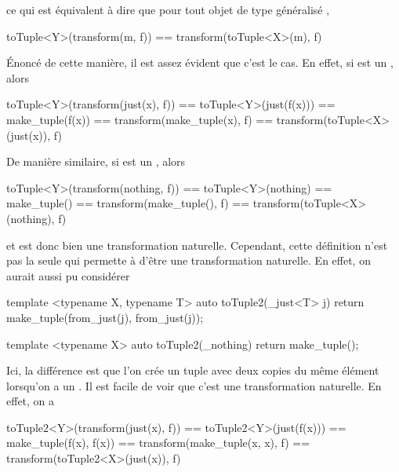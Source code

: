 ce qui est équivalent à dire que pour tout objet  de type généralisé
,
\begin{cpp}
    toTuple<Y>(transform(m, f)) == transform(toTuple<X>(m), f)
\end{cpp}

Énoncé de cette manière, il est assez évident que c'est le cas. En effet, si
 est un , alors
\begin{cpp}
    toTuple<Y>(transform(just(x), f)) == toTuple<Y>(just(f(x)))
                                      == make_tuple(f(x))
                                      == transform(make_tuple(x), f)
                                      == transform(toTuple<X>(just(x)), f)
\end{cpp}

De manière similaire, si  est un , alors
\begin{cpp}
    toTuple<Y>(transform(nothing, f)) == toTuple<Y>(nothing)
                                      == make_tuple()
                                      == transform(make_tuple(), f)
                                      == transform(toTuple<X>(nothing), f)
\end{cpp}

et  est donc bien une transformation naturelle. Cependant, cette
définition n'est pas la seule qui permette à  d'être une
transformation naturelle. En effet, on aurait aussi pu considérer
\begin{cpp}
    template <typename X, typename T>
    auto toTuple2(_just<T> j) {
        return make_tuple(from_just(j), from_just(j));
    }

    template <typename X>
    auto toTuple2(_nothing) {
        return make_tuple();
    }
\end{cpp}

Ici, la différence est que l'on crée un tuple avec deux copies du même élément
lorsqu'on a un . Il est facile de voir que c'est une
transformation naturelle. En effet, on a
\begin{cpp}
    toTuple2<Y>(transform(just(x), f)) == toTuple2<Y>(just(f(x)))
                                       == make_tuple(f(x), f(x))
                                       == transform(make_tuple(x, x), f)
                                       == transform(toTuple2<X>(just(x)), f)
\end{cpp}

